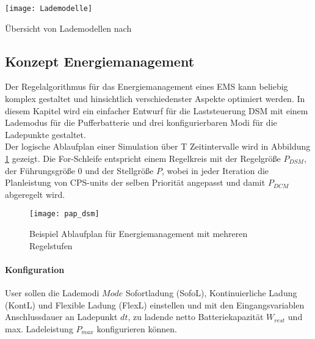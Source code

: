				\begin{table}[h]
					\centering
					\texttt{[image: Lademodelle]}
					\caption{Übersicht von Lademodellen nach \cite[modifizierte Grafiken]{FfE_Lademodelle_EAutos}}
					\label{Tab:Lademodelle}
				\end{table}

		\subsection{Konzept Energiemanagement}
		\label{Kap:DSM}
			Der Regelalgorithmus für das Energiemanagement eines EMS kann beliebig komplex gestaltet und hinsichtlich verschiedenster Aspekte optimiert werden. In diesem Kapitel wird ein einfacher Entwurf für die Laststeuerung \ac{DSM} mit einem Lademodus für die Pufferbatterie und drei konfigurierbaren Modi für die Ladepunkte gestaltet. \\

			Der logische Ablaufplan einer Simulation über T Zeitintervalle wird in Abbildung \ref{Abb:pap_dsm} gezeigt. Die For-Schleife entspricht einem Regelkreis mit der Regelgröße $P_{DSM}$, der Führungsgröße $0$ und der Stellgröße $P$, wobei in jeder Iteration die Planleistung von CPS-units der selben Priorität angepasst und damit $P_{DCM}$ abgeregelt wird.

			\begin{figure}[h] 
				\centering
				\texttt{[image: pap\_dsm]}
				\caption{Beispiel Ablaufplan für Energiemanagement mit mehreren Regelstufen}
				\label{Abb:pap_dsm}
			\end{figure}	
			
		\paragraph{Konfiguration} 
			User sollen die Lademodi $Mode$  Sofortladung (SofoL), Kontinuierliche Ladung (KontL) und Flexible Ladung (FlexL) einstellen und mit den Eingangsvariablen Anschlussdauer an Ladepunkt $dt$, zu ladende netto Batteriekapazität $W_{rest}$ und max. Ladeleistung $P_{max}$  konfigurieren können. \\  

